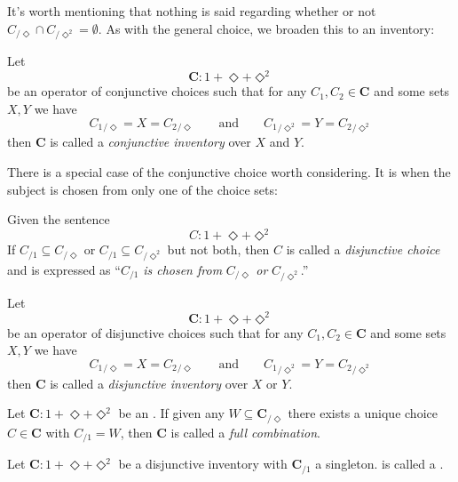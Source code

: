 \documentclass[twoside]{book}
\newcommand{\pass}[1][\Diamond]{\ensuremath{{_{\!/{#1}}}}}
\newcommand{\passes}[2][\Diamond]{\ensuremath{{_{\!/{#1}^{#2}}}}}
\newcommand{\syntaxes}[1][\Diamond]{\ensuremath{1+{#1}+{#1}^2}}
\renewcommand{\bold}[1][C]{\ensuremath{{\mathbf #1}}}
\newenvironment{definition}[1][Definition]{\begin{trivlist}
\item[\hskip \labelsep {\bfseries Definition (#1):}]}{\end{trivlist}}
\begin{document}
It's worth mentioning that nothing is said regarding whether or not $ C\pass\cap C\passes{2}=\emptyset $.
As with the general choice, we broaden this to an inventory:

\begin{definition}[\hypertarget{ConjunctiveInventory}{\hyperlink{oConjunctiveInventory}{Conjunctive Inventory}}]

Let
$$ \bold[C:\syntaxes] $$
be an operator of conjunctive choices such that for any $ C_1, C_2\in\bold $ and some sets $ X, Y $ we have
$$ C_1\pass=X=C_2\pass\qquad\mbox{and}\qquad C_1\passes{2}=Y=C_2\passes{2} $$
then $ \bold $ is called a \emph{conjunctive inventory} over $ X $ and $ Y $.

\end{definition}

There is a special case of the conjunctive choice worth considering.  It is when the subject is chosen from only
one of the choice sets:

\begin{definition}[\hypertarget{DisjunctiveChoice}{\hyperlink{oDisjunctiveChoice}{Disjunctive Choice}}]

Given the sentence
$$ C:\syntaxes $$
If $ C\pass[1]\subseteq C\pass $ or $ C\pass[1]\subseteq C\passes{2} $ but not both,
then $ C $ is called a \emph{disjunctive choice} and is expressed as ``$ C\pass[1] $
\emph{is chosen from} $ C\pass $ \emph{or} $ C\passes{2} $.''

\end{definition}

\begin{definition}[\hypertarget{DisjunctiveInventory}{\hyperlink{oDisjunctiveInventory}{Disjunctive Inventory}}]

Let
$$ \bold[C:\syntaxes] $$
be an operator of disjunctive choices such that for any $ C_1, C_2\in\bold $ and some sets $ X, Y $ we have
$$ C_1\pass=X=C_2\pass\qquad\mbox{and}\qquad C_1\passes{2}=Y=C_2\passes{2} $$
then $ \bold $ is called a \emph{disjunctive inventory} over $ X $ or $ Y $.

\end{definition}

Let $ \bold[C:\syntaxes] $ be an .  If given any $ W\subseteq\bold\pass $ there exists a unique choice $ C\in\bold $ with
$ C\pass[1]=W $, then $ \bold $ is called a \emph{full combination}.

Let $ \bold[C:\syntaxes] $ be a disjunctive inventory with $ \bold\pass[1] $ a singleton.
is called a \emph{}.
\end{document}
